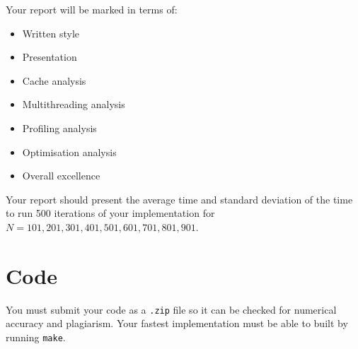 \documentclass[a4paper,11pt]{article}
\newcommand{\code}[1]{\texttt{#1}}
\begin{document}

Your report will be marked in terms of:
%
\begin{itemize}
\item Written style
\item Presentation
\item Cache analysis
\item Multithreading analysis
\item Profiling analysis 
\item Optimisation analysis
\item Overall excellence  
\end{itemize}

Your report should present the average time and standard deviation of
the time to run 500 iterations of your implementation for $N=101, 201,
301, 401, 501, 601, 701, 801, 901$.



\section{Code}

You must submit your code as a \code{.zip} file so it can be checked
for numerical accuracy and plagiarism.  Your fastest implementation
must be able to built by running \code{make}.
\end{document}
